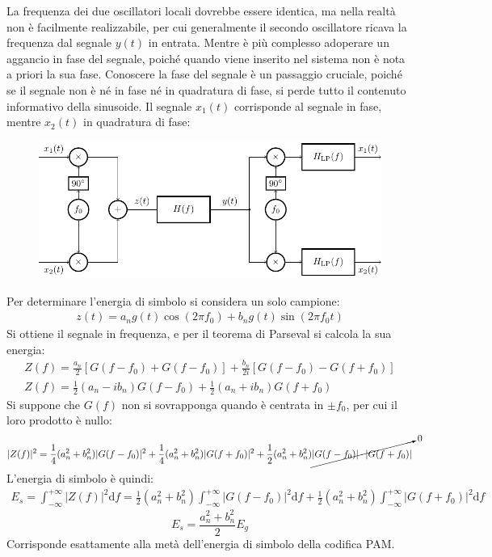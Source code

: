 \documentclass{article}
\newcommand{\df}{\mathrm{d}}
\newcommand{\intinf}{\displaystyle\int_{-\infty}^{+\infty}}
\numberwithin{equation}{subsection}
\begin{document}
La frequenza dei due oscillatori locali dovrebbe essere identica, ma nella realtà non è facilmente realizzabile, per cui 
generalmente il secondo oscillatore ricava la frequenza dal segnale $y(t)$ in entrata. Mentre è più complesso adoperare un aggancio in fase del segnale, poiché 
quando viene inserito nel sistema non è nota a priori la sua fase. Conoscere la fase del segnale è un passaggio cruciale, poiché se il segnale non è né in fase né in 
quadratura di fase, si perde tutto il contenuto informativo della sinusoide. 
Il segnale $x_1(t)$ corrisponde al segnale in fase, mentre $x_2(t)$ in quadratura di fase:
\begin{figure}[H]%
    \centering
    \includegraphics{qam.pdf}
\end{figure}



Per determinare l'energia di simbolo si considera un solo campione:
\begin{gather*}
    z(t)=a_ng(t)\cos(2\pi f_0)+b_ng(t)\sin(2\pi f_0t)
\end{gather*}
Si ottiene il segnale in frequenza, e per il teorema di Parseval si calcola la sua energia:
\begin{gather*}
    Z(f)=\displaystyle\frac{a_n}{2}\left[G(f-f_0)+G(f-f_0)\right]+\frac{b_n}{2i}\left[G(f-f_0)-G(f+f_0)\right]\\
    Z(f)=\displaystyle\frac{1}{2}(a_n-ib_n)G(f-f_0)+\frac{1}{2}(a_n+ib_n)G(f+f_0)
\end{gather*}
Si suppone che $G(f)$ non si sovrapponga quando è centrata in $\pm f_0$, per cui il loro prodotto è nullo:
\begin{gather*}
    |Z(f)|^2=\displaystyle\frac{1}{4}(a_n^2+b_n^2)|G(f-f_0)|^2+\frac{1}{4}(a_n^2+b_n^2)|G(f+f_0)|^2+\frac{1}{2}(a_n^2+b_n^2)\cancelto{0}{|G(f-f_0)|\cdot|G(f+f_0)|}
\end{gather*}
L'energia di simbolo è quindi:
\begin{gather*}
    E_s=\intinf |Z(f)|^2\df f=\frac{1}{2}(a_n^2+b_n^2)\intinf |G(f-f_0)|^2\df f+\frac{1}{2}(a_n^2+b_n^2)\intinf |G(f+f_0)|^2\df f
\end{gather*}
\begin{equation}
    E_s=\displaystyle\frac{a_n^2+b_n^2}{2}E_g
\end{equation}
Corrisponde esattamente alla metà dell'energia di simbolo della codifica PAM. 
\end{document}
